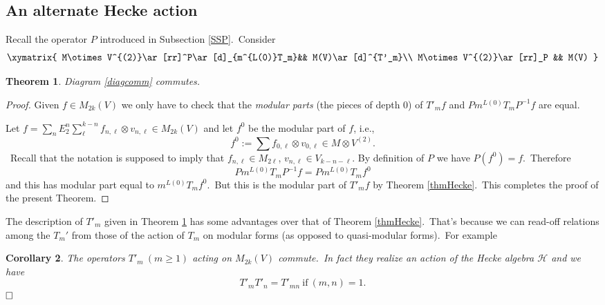 \documentclass[12pt]{amsart}
\theoremstyle{plain}
\newtheorem{thm}{Theorem}[section]
\newtheorem{cor}[thm]{Corollary}
\theoremstyle{definition}
\theoremstyle{remark}
\begin{document}
\subsection{An alternate Hecke action}Recall the operator $P$ introduced in Subsection \ref{SSP}.\ Consider
    \begin{equation}\label{diagcomm}
    \xymatrix{
M\otimes V^{(2)}\ar[rr]^P\ar[d]_{m^{L(0)}T_m}&& M(V)\ar[d]^{T'_m}\\
M\otimes V^{(2)}\ar[rr]_P && M(V)
    }
    \end{equation}
    
    \begin{thm}\label{thmcommdiag}
    Diagram \eqref{diagcomm} commutes.
    \end{thm}
    \begin{proof}
        Given $f\in M_{2k}(V)$ we only have to check that the \emph{modular parts} (the pieces of depth $0$) of $T'_mf$ and $Pm^{L(0)}T_mP^{-1}f$ are equal.

        Let $f=\sum_n E_2^n\sum_{\ell}^{k-n} f_{n, \ell}\otimes v_{n, \ell}\in M_{2k}(V)$ and let $f^0$ be the modular part of $f$, i.e.,
    $$f^0:=\sum f_{0, \ell}\otimes v_{0, \ell}\in M\otimes V^{(2)}.$$\ Recall that the notation is supposed to imply that
    $f_{n, \ell}\in M_{2\ell}$, $v_{n, \ell}\in V_{k-n-\ell}$. By definition of $P$ we have $P(f^0)=f$.\ Therefore
    $$Pm^{L(0)}T_mP^{-1}f=Pm^{L(0)}T_mf^0$$
    and this has modular part equal to $m^{L(0)}T_mf^0$.\ But this is the modular part of $T'_mf$ by Theorem \ref{thmHecke}.\ This completes the proof of the present Theorem.
    \end{proof}
    
The description of $T'_m$ given in Theorem \ref{thmcommdiag} has some advantages over that of Theorem \ref{thmHecke}.\ That's because we can read-off relations among the $T_m'$ from those of the action of $T_m$ on modular forms (as opposed to quasi-modular forms).\ For example
\begin{cor}
 The operators $T'_m\ (m\geq 1)$ acting on $M_{2k}(V)$ \textit{commute}.\ In fact they realize an action of the Hecke algebra $\mathcal{H}$ and we have
 $$T'_m T'_n = T'_{mn}\ \mbox{if}\ (m, n)=1.$$
 $\hfill\Box$
\end{cor}
\end{document}
